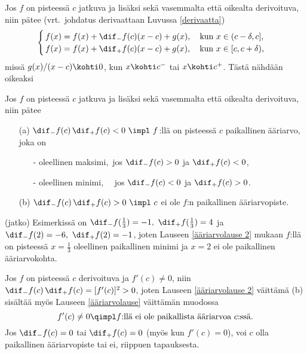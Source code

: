 Jos $f$ on pisteessä $c$ jatkuva ja lisäksi sekä vasemmalta että oikealta derivoituva, niin 
pätee (vrt.\ johdatus derivaattaan Luvussa \ref{derivaatta})
\[
\begin{cases}
\,f(x)=f(x)+\dif_-f(c)(x-c)+g(x), \quad \text{kun}\ x \in (c-\delta,c], \\
\,f(x)=f(x)+\dif_+f(c)(x-c)+g(x), \quad \text{kun}\ x \in [c,c+\delta),
\end{cases}
\]
missä $g(x)/(x-c) \kohti 0$, kun $x \kohti c^-$ tai $x \kohti c^+$. Tästä nähdään oikeaksi
\begin{Lause} \label{ääriarvolause 2} Jos $f$ on pisteessä $c$ jatkuva ja lisäksi sekä 
vasemmalta että oikealta derivoituva, niin pätee
\begin{itemize}
\item[(a)] $\dif_-f(c)\,\dif_+f(c)<0 \ \impl \ f$:llä on pisteessä $c$ paikallinen ääriarvo,
joka on
\begin{itemize}
\item[-] oleellinen maksimi,\,  jos $\dif_-f(c)>0$ ja $\dif_+f(c)<0$,
\item[-] oleellinen minimi, \ \ jos $\dif_-f(c)<0$ ja $\dif_+f(c)>0$.
\end{itemize}
\item[(b)] $\dif_-f(c)\,\dif_+f(c)>0 \ \impl\ c$ ei ole $f$:n paikallinen ääriarvopiste.
\end{itemize}
\end{Lause}
\jatko \begin{Exa} (jatko) Esimerkissä on $\dif_-f(\tfrac{1}{3})=-1,\ \dif_+f(\tfrac{1}{3})=4$
ja $\dif_-f(2)=-6,\ \dif_+f(2)=-1$, joten Lauseen \ref{ääriarvolause 2} mukaan $f$:llä on
pisteessä  $x=\tfrac{1}{3}$ oleellinen paikallinen minimi ja $x=2$ ei ole paikallinen
ääriarvokohta. \loppu
\end{Exa}
Jos $f$ on pisteessä $c$ derivoituva ja $f'(c) \neq 0$, niin
$\dif_-f(c)\,\dif_+f(c) = [f'(c)]^2 > 0$, joten Lauseen \ref{ääriarvolause 2} väittämä (b)
sisältää myös Lauseen \ref{ääriarvolause} väittämän muodossa
\[
f'(c) \neq 0 \qimpl \text{$f$:llä ei ole paikallista ääriarvoa $c$:ssä}.
\]
Jos $\dif_-f(c)=0$ tai $\dif_+f(c)=0$ (myös kun $f'(c)=0$), voi $c$ olla paikallinen
ääriarvopiste tai ei, riippuen tapauksesta.
